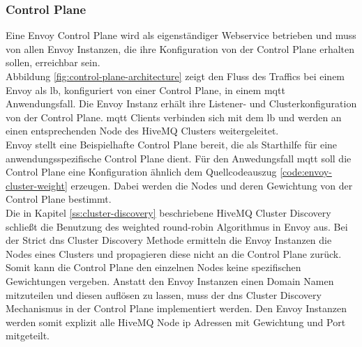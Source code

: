 \subsubsection{Control Plane} \label{ss:control-plane}
Eine Envoy Control Plane wird als eigenständiger Webservice betrieben und muss von allen Envoy Instanzen, die ihre Konfiguration von der Control Plane erhalten sollen, erreichbar sein.
\\
Abbildung \ref{fig:control-plane-architecture} zeigt den Fluss des Traffics bei einem Envoy als \acl{lb}, konfiguriert von einer Control Plane, in einem \ac{mqtt} Anwendungsfall. Die Envoy Instanz erhält ihre Listener- und Clusterkonfiguration von der Control Plane. \ac{mqtt} Clients verbinden sich mit dem \ac{lb} und werden an einen entsprechenden Node des HiveMQ Clusters weitergeleitet.
\\
Envoy stellt eine Beispielhafte Control Plane \cite{DynamicConfigurationControl} bereit, die als Starthilfe für eine anwendungsspezifische Control Plane dient. Für den Anwedungsfall \ac{mqtt} soll die Control Plane eine Konfiguration ähnlich dem Quellcodeauszug \ref{code:envoy-cluster-weight} erzeugen. Dabei werden die Nodes und deren Gewichtung von der Control Plane bestimmt.
\\
Die in Kapitel \ref{ss:cluster-discovery} beschriebene HiveMQ Cluster Discovery schlie{\ss}t die Benutzung des weighted round-robin Algorithmus in Envoy aus.
Bei der Strict \ac{dns} Cluster Discovery Methode ermitteln die Envoy Instanzen die Nodes eines Clusters und propagieren diese nicht an die Control Plane zurück. Somit kann die Control Plane den einzelnen Nodes keine spezifischen Gewichtungen vergeben.
Anstatt den Envoy Instanzen einen Domain Namen mitzuteilen und diesen auflösen zu lassen, muss der \ac{dns} Cluster Discovery Mechanismus in der Control Plane implementiert werden. Den Envoy Instanzen werden somit explizit alle HiveMQ Node \ac{ip} Adressen mit Gewichtung und Port mitgeteilt.
